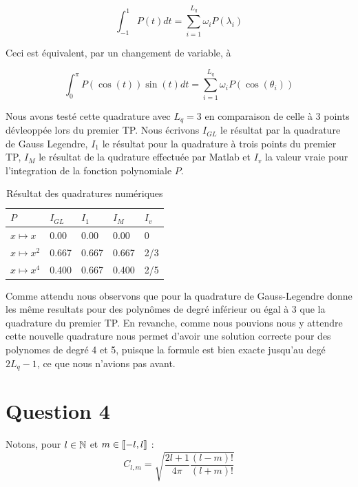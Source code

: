 \documentclass[10pt]{article}
\begin{document}
\begin{multicols}{2}
\begin{equation}
	\int_{-1}^{1}{P(t)dt} = \sum_{i=1}^{L_q}{\omega_i P(\lambda_i)}
\end{equation}

Ceci est équivalent, par un changement de variable, à

\begin{equation}
	\int_{0}^{\pi}{P(\cos(t))\sin(t)dt} = \sum_{i=1}^{L_q}{\omega_i P(\cos(\theta_i))}
\end{equation}

Nous avons testé cette quadrature avec $L_q = 3$ en comparaison de celle à 3 points dévleoppée lors du premier TP. Nous écrivons $I_{GL}$ le résultat par la quadrature de Gauss Legendre, $I_{1}$ le résultat pour la quadrature à trois points du premier TP, $I_{M}$ le résultat de la qudrature effectuée par Matlab et $I_v$ la valeur vraie pour l'integration de la fonction polynomiale $P$.

\begin{table}[H]
\centering
\begin{tabular}{m{2cm} |m{1cm} m{1cm} m{1cm} m{1cm}} 
   \hline
    \centering $P$ & $I_{GL}$ & $I_{1}$ & $I_{M}$ & $I_v$ \\
    \toprule
    \toprule
    $x \mapsto x$      & 0.00 & 0.00 & 0.00 & 0 \\
    $x \mapsto x^{2}$  & 0.667 & 0.667 & 0.667 & 2/3 \\
    $x \mapsto x^{4}$  & 0.400 & 0.667 & 0.400 & 2/5 \\
    \hline
\end{tabular}
\caption{Résultat des quadratures numériques}
\end{table}

Comme attendu nous observons que pour la quadrature de Gauss-Legendre donne les même resultats pour des polynômes de degré inférieur ou égal à 3 que la quadrature du premier TP. En revanche, comme nous pouvions nous y attendre cette nouvelle quadrature nous permet d'avoir une solution correcte pour des polynomes de degré 4 et 5, puisque la formule est bien exacte jusqu'au degé $2L_q-1$, ce que nous n'avions pas avant. 


\vspace*{12pt}

\section*{Question 4}

Notons, pour $l\in\mathbb{N}$ et $m\in \llbracket -l,l \rrbracket $ :
\begin{equation}
	C_{l,m} = \sqrt{\frac{2l+1}{4\pi}\frac{(l-m)!}{(l+m)!}}
\end{equation}


\end{multicols}
\end{document}
